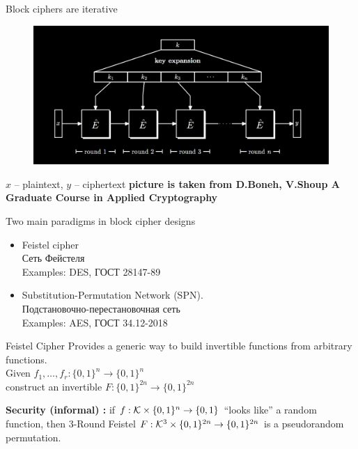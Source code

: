 \documentclass[usenames,dvipsnames, 9pt]{beamer}
\begin{document}
\begin{frame}{Block ciphers are iterative}
	\begin{figure}
		\includegraphics[width=1.1\textwidth]{BlockCipher}
	\end{figure}
	
	\Large 
	$x$ -- plaintext, $y$ -- ciphertext
	\vfill
	\small
	{\color{gray}\textbf{picture is taken from D.Boneh, V.Shoup A Graduate Course in Applied Cryptography}} 
\end{frame}

\begin{frame}{Two main paradigms in block cipher designs}

\begin{itemize}
	\itemsep 2em
	\LARGE
	\item Feistel cipher \\
	Сеть Фейстеля
	\\[5pt]
	
	\Large
	Examples: DES, ГОСТ 28147-89
	\LARGE
	\item Substitution-Permutation Network (SPN). \\ Подстановочно-перестановочная сеть  \\[5pt]
	\Large
	Examples: AES, ГОСТ 34.12-2018
	
\end{itemize}
\end{frame}

\begin{frame}{Feistel Cipher}
\Large
	Provides a generic way to build invertible functions from arbitrary functions. \\[10pt]
	Given \hspace{40pt} $f_1, \ldots, f_r: \{0,1\}^n \rightarrow \{0,1\}^n$ \\[7pt]
	construct an invertible $F:\{0,1\}^{2n} \rightarrow \{0,1\}^{2n}$ \\
	
	\vspace{20pt}
	\pause
	
	{\color{Orange}\textbf{Security (informal) :}} if $f: \mathcal{K} \times \{0,1\}^n \rightarrow \{0,1\}$ ``looks like'' a random function, then 3-Round Feistel $F: \mathcal{K}^3 \times \{0,1\}^{2n} \rightarrow \{0,1\}^{2n}$ is a pseudorandom permutation. 
\end{frame}
\end{document}
